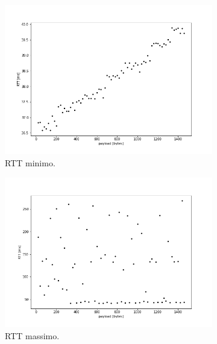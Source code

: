\documentclass[a4paper,10pt]{article}
\begin{document}
\begin{figure}[h!]
     \centering
     \begin{subfigure}[b]{0.325\textwidth}
         \centering
         \includegraphics[width=\textwidth]{img/min.png}
         \caption{RTT minimo.}
         \label{fig:rttmin}
     \end{subfigure}
     \hfill
     \begin{subfigure}[b]{0.325\textwidth}
         \centering
         \includegraphics[width=\textwidth]{img/max.png}
         \caption{RTT massimo.}
         \label{fig:rttmax}
     \end{subfigure}
     \hfill
     \begin{subfigure}[b]{0.325\textwidth}
         \centering

\end{subfigure}
\end{figure}
\end{document}

